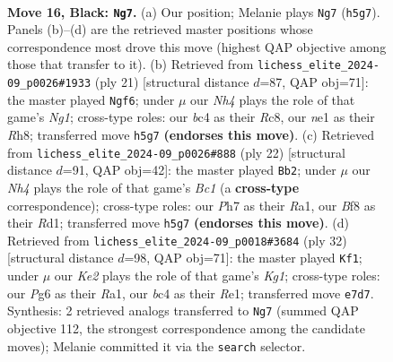 \documentclass[11pt]{article}
\begin{document}
\begin{figure}[p]
\label{fig:thought-m29}
\end{figure}

\clearpage

\begin{figure}[p]\centering
\begin{subfigure}{0.46\textwidth}\centering
\resizebox{\linewidth}{!}{%
\newchessgame
\chessboard[
  setfen={rn2bbr1/1p2k2p/p3p1p1/2P2p1n/P1B5/2N1PP2/1P3RPP/1RB1N1K1 b - - 1 16},
  showmover=false,
  pgfstyle=straightmove, color=movearrow, markmove={h5-g7}
]}
\caption{}
\end{subfigure}\hfill
\begin{subfigure}{0.46\textwidth}\centering
\resizebox{\linewidth}{!}{%
\newchessgame
\chessboard[
  setfen={2r1kbnr/1p1n1ppp/p3p3/2Pp1b2/3P4/2N2N2/1P2PPPP/R1B1KB1R b KQk - 2 11},
  showmover=false,
  pgfstyle=straightmove, color=movearrow, markmove={g8-f6}
]}
\caption{}
\end{subfigure}
\\[4pt]
\begin{subfigure}{0.46\textwidth}\centering
\resizebox{\linewidth}{!}{%
\newchessgame
\chessboard[
  setfen={r1b2rk1/pp3ppp/1bn1pn2/8/1P6/P1N2NP1/4PPBP/R1BR2K1 w - - 1 12},
  showmover=false,
  pgfstyle=straightmove, color=movearrow, markmove={c1-b2}
]}
\caption{}
\end{subfigure}\hfill
\begin{subfigure}{0.46\textwidth}\centering
\resizebox{\linewidth}{!}{%
\newchessgame
\chessboard[
  setfen={3rr1k1/1pp2pp1/1bn4p/p2np3/P7/2PP1NNP/1P3PP1/R1B1R1K1 w - - 4 17},
  showmover=false,
  pgfstyle=straightmove, color=movearrow, markmove={g1-f1}
]}
\caption{}
\end{subfigure}
\caption{\textbf{Move 16, Black: \texttt{Ng7}.} (a) Our position; Melanie plays \texttt{Ng7} (\texttt{h5g7}). Panels (b)--(d) are the retrieved master positions whose correspondence most drove this move (highest QAP objective among those that transfer to it). (b) Retrieved from \texttt{lichess\_elite\_2024-09\_p0026\#1933} (ply 21) [structural distance $d$=87, QAP obj=71]: the master played \texttt{Ngf6}; under $\mu$ our \emph{Nh4} plays the role of that game's \emph{Ng1}; cross-type roles: our \emph{b}c4 as their \emph{R}c8, our \emph{n}e1 as their \emph{R}h8; transferred move \texttt{h5g7} \textbf{(endorses this move)}. (c) Retrieved from \texttt{lichess\_elite\_2024-09\_p0026\#888} (ply 22) [structural distance $d$=91, QAP obj=42]: the master played \texttt{Bb2}; under $\mu$ our \emph{Nh4} plays the role of that game's \emph{Bc1} (a \textbf{cross-type} correspondence); cross-type roles: our \emph{P}h7 as their \emph{R}a1, our \emph{B}f8 as their \emph{R}d1; transferred move \texttt{h5g7} \textbf{(endorses this move)}. (d) Retrieved from \texttt{lichess\_elite\_2024-09\_p0018\#3684} (ply 32) [structural distance $d$=98, QAP obj=71]: the master played \texttt{Kf1}; under $\mu$ our \emph{Ke2} plays the role of that game's \emph{Kg1}; cross-type roles: our \emph{P}g6 as their \emph{R}a1, our \emph{b}c4 as their \emph{R}e1; transferred move \texttt{e7d7}. Synthesis: 2 retrieved analogs transferred to \texttt{Ng7} (summed QAP objective 112, the strongest correspondence among the candidate moves); Melanie committed it via the \texttt{search} selector.}

\end{figure}
\end{document}
